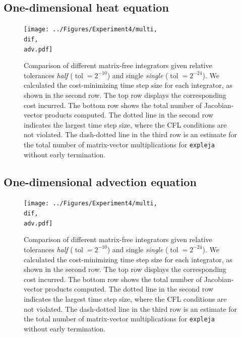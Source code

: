 \documentclass{scrartcl}
\begin{document}
\subsection*{One-dimensional heat equation}
\begin{figure}[H]
	\newcommand{\dif}{\detokenize{α}=1}
	\newcommand{\adv}{\detokenize{β}=0}
	\centering
	\texttt{[image: ../Figures/Experiment4/multi, \\dif, \\adv.pdf]}
	\caption{Comparison of different matrix-free integrators given relative tolerances \textit{half} ($\operatorname{tol} = 2^{-10}$) and single \textit{single} ($\operatorname{tol} = 2^{-24}$). We calculated the cost-minimizing time step size for each integrator, as shown in the second row. The top row displays the corresponding cost incurred. The bottom row shows the total number of Jacobian-vector products computed. The dotted line in the second row indicates the largest time step size, where the CFL conditions are not violated. The dash-dotted line in the third row is an estimate for the total number of matrix-vector multiplications for \texttt{expleja} without early termination.}
	\label{fig:heat}
\end{figure}

\subsection*{One-dimensional advection equation}
\begin{figure}[H]
	\newcommand{\dif}{\detokenize{α}=0}
	\newcommand{\adv}{\detokenize{β}=1}
	\centering
	\texttt{[image: ../Figures/Experiment4/multi, \\dif, \\adv.pdf]}
	\caption{Comparison of different matrix-free integrators given relative tolerances \textit{half} ($\operatorname{tol} = 2^{-10}$) and single \textit{single} ($\operatorname{tol} = 2^{-24}$). We calculated the cost-minimizing time step size for each integrator, as shown in the second row. The top row displays the corresponding cost incurred. The bottom row shows the total number of Jacobian-vector products computed. The dotted line  in the second row indicates the largest time step size, where the CFL conditions are not violated. The dash-dotted line in the third row is an estimate for the total number of matrix-vector multiplications for \texttt{expleja} without early termination.}
	\label{fig:advection}
\end{figure}
\clearpage
\end{document}
